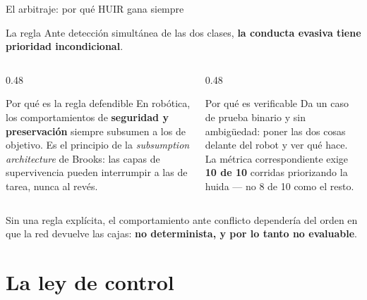 \documentclass[aspectratio=169,10pt]{beamer}
\begin{document}
\begin{frame}{El arbitraje: por qué HUIR gana siempre}
  \begin{block}{La regla}
    \centering\large
    Ante detección simultánea de las dos clases, \textbf{la conducta evasiva
    tiene prioridad incondicional}.
  \end{block}

  \vspace{0.6em}
  \begin{columns}[T,onlytextwidth]
    \begin{column}{0.48\textwidth}
      \begin{block}{Por qué es la regla defendible}
        \small
        En robótica, los comportamientos de \textbf{seguridad y preservación}
        siempre subsumen a los de objetivo. Es el principio de la
        \emph{subsumption architecture} de Brooks: las capas de supervivencia
        pueden interrumpir a las de tarea, nunca al revés.
      \end{block}
    \end{column}
    \begin{column}{0.48\textwidth}
      \begin{block}{Por qué es verificable}
        \small
        Da un caso de prueba binario y sin ambigüedad: poner las dos cosas
        delante del robot y ver qué hace. La métrica correspondiente exige
        \textbf{10 de 10} corridas priorizando la huida --- no 8 de 10 como el
        resto.
      \end{block}
    \end{column}
  \end{columns}

  \vspace{0.6em}
  \small
  Sin una regla explícita, el comportamiento ante conflicto dependería del orden
  en que la red devuelve las cajas: \textbf{no determinista, y por lo tanto no
  evaluable}.
\end{frame}

\section{La ley de control}
\end{document}
